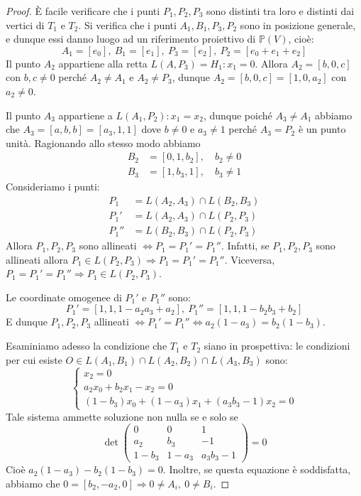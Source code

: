 \begin{proof}
È facile verificare che i punti $P_1,P_2,P_3$ sono distinti tra loro e distinti dai vertici di $T_1$ e $T_2$. Si verifica che i punti $A_1, B_1, P_3, P_2$ sono in posizione generale, e dunque essi danno luogo ad un riferimento proiettivo di $\mathbb{P}(V)$, cioè:
$$A_1=[e_0],\ B_1=[e_1],\ P_3=[e_2],\ P_2=[e_0+e_1+e_2]$$
Il punto $A_2$ appartiene alla retta $L(A,P_3)=H_1:x_1=0$. Allora $A_2=[b,0,c]$ con $b,c \neq 0$ perché $A_2 \neq A_1$ e $A_2 \neq P_3$, dunque $A_2=[b,0,c]=[1,0,a_2]$ con $a_2 \neq 0$.

Il punto $A_3$ appartiene a $L(A_1,P_2):x_1=x_2$, dunque poiché $A_3 \neq A_1$ abbiamo che $A_3=[a,b,b]=[a_3,1,1]$ dove $b \neq 0$ e $a_3 \neq 1$ perché $A_3=P_2$ è un punto unità. Ragionando allo stesso modo abbiamo
\begin{align*}
B_2&=[0,1,b_2], \quad b_2 \neq 0\\
B_3&=[1,b_3,1], \quad b_3 \neq 1
\end{align*}
Consideriamo i punti:
\begin{align*}
P_1&=L(A_2,A_3)\cap L(B_2,B_3)\\
P_1'&=L(A_2,A_3)\cap L(P_2,P_3)\\
P_1''&=L(B_2,B_3)\cap L(P_2,P_3)
\end{align*}
Allora $P_1,P_2,P_3$ sono allineati $\Leftrightarrow P_1=P_1'=P_1''$. Infatti, se $P_1, P_2, P_3$ sono allineati allora $P_1 \in L(P_2,P_3) \Rightarrow P_1=P_1'=P_1''$. Viceversa, $P_1=P_1'=P_1'' \Rightarrow P_1 \in L(P_2,P_3)$.

Le coordinate omogenee di $P_1'$ e $P_1''$ sono:
$$P_1'=[1,1,1-a_2a_3+a_2],\ P_1''=[1,1,1-b_2b_3+b_2]$$
E dunque $P_1,P_2,P_3$ allineati $\Leftrightarrow P_1'=P_1'' \Leftrightarrow a_2(1-a_3)=b_2(1-b_3)$.

Esaminiamo adesso la condizione che $T_1$ e $T_2$ siano in prospettiva: le condizioni per cui esiste $O \in L(A_1,B_1)\cap L(A_2,B_2)\cap L(A_3,B_3)$ sono:
$$\begin{cases}
x_2=0\\
a_2x_0+b_2x_1-x_2=0\\
(1-b_3)x_0+(1-a_3)x_1+(a_3b_3-1)x_2=0
\end{cases}$$
Tale sistema ammette soluzione non nulla se e solo se
$$\det \begin{pmatrix}
0 & 0 & 1 \\ a_2 & b_3 & -1 \\ 1-b_3 & 1-a_3 & a_3b_3-1
\end{pmatrix}=0$$
Cioè $a_2(1-a_3)-b_2(1-b_3)=0$. Inoltre, se questa equazione è soddisfatta, abbiamo che $0=[b_2,-a_2,0] \Rightarrow 0 \neq A_i,\ 0 \neq B_i$.
\end{proof}